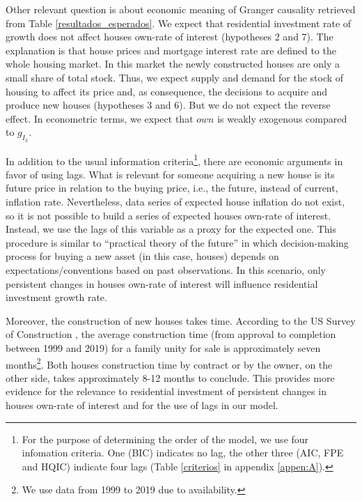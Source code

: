 \documentclass[12pt, a4paper]{article}
\begin{document}




Other relevant question is about economic meaning of Granger causality retrieved from Table \ref{resultados_esperados}.
We expect that residential investment rate of growth does not affect  houses own-rate of interest (hypotheses 2 and 7).
The explanation is that house prices and mortgage interest rate are defined to the whole housing market.
In this market the newly constructed houses are only a small share of total stock.
Thus, we expect supply and demand for the stock of housing to affect its price and, as consequence,  the decisions to acquire and produce new houses (hypotheses 3 and 6).
But we do not expect the reverse effect.
In econometric terms, we expect that \(own\) is weakly exogenous compared to \(g_{I_{h}}\).

In addition to the usual information criteria\footnote{For the purpose of determining the order of the model, we use four infomation criteria. One (BIC) indicates no lag, the other three (AIC, FPE and HQIC) indicate four lags (Table \ref{criterios} in appendix \ref{appen:A}).}, there are economic arguments in favor of using lags.
What is relevant for someone acquiring a new house is its future price in relation to the buying price, i.e., the future, instead of current, inflation rate.
Nevertheless, data series of expected house inflation do not exist, so it is not possible to build a series of expected houses own-rate of interest.
Instead, we use the lags of this variable as a proxy for the expected one.
This procedure is similar to \textcite{keynes_general_1937}  ``practical theory of the future'' in which decision-making process for buying a new asset (in this case, houses) depends on expectations/conventions based on past observations.
In this scenario, only persistent changes in houses own-rate of interest will influence residential investment growth rate.

Moreover, the construction of new houses takes time. According to the US Survey of Construction \parencite{SoC_2020}, the average construction time (from approval to completion between 1999 and 2019) for a family unity for sale is approximately seven months\footnote{We use data from 1999 to 2019 due to availability.}.
Both houses construction time by contract or by the owner, on the other side, takes approximately 8-12 months to conclude.
This provides more evidence for the relevance to residential investment of persistent changes in houses own-rate of interest and for the use of lags in our model.
\end{document}
